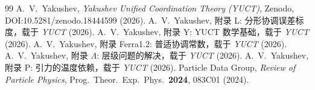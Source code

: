 \documentclass[12pt,a4paper]{article}
\begin{document}
	\begin{thebibliography}{99}
		 A.~V.~Yakushev, \emph{Yakushev Unified Coordination Theory (YUCT)}, Zenodo, DOI:10.5281/zenodo.18444599 (2026).
		 A.~V.~Yakushev, 附录 L: 分形协调误差标度，载于 \emph{YUCT} (2026).
		 A.~V.~Yakushev, 附录 Y: YUCT 数学基础，载于 \emph{YUCT} (2026).
		 A.~V.~Yakushev, 附录 Ferra1.2: 普适协调常数，载于 \emph{YUCT} (2026).
		 A.~V.~Yakushev, 附录 \(\Lambda\): 层级问题的解决，载于 \emph{YUCT} (2026).
		 A.~V.~Yakushev, 附录 P: 引力的温度依赖，载于 \emph{YUCT} (2026).
		 Particle Data Group, \emph{Review of Particle Physics}, Prog.\ Theor.\ Exp.\ Phys.\ \textbf{2024}, 083C01 (2024).
	\end{thebibliography}
	
\end{document}

